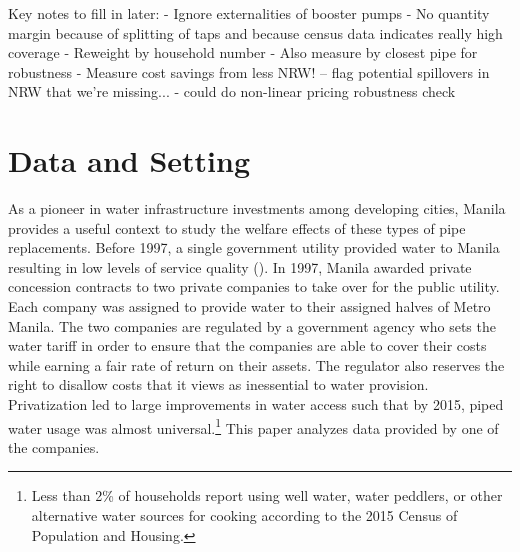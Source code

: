 \documentclass[12pt,table]{article}
\begin{document}
Key notes to fill in later:
- Ignore externalities of booster pumps
- No quantity margin because of splitting of taps and because census data indicates really high coverage
- Reweight by household number
- Also measure by closest pipe for robustness
- Measure cost savings from less NRW! 
	-- flag potential spillovers in NRW that we're missing...
- could do non-linear pricing robustness check







\section{Data and Setting}\label{section:data}

As a pioneer in water infrastructure investments among developing cities, Manila provides a useful context to study the welfare effects of these types of pipe replacements.  Before 1997, a single government utility provided water to Manila resulting in low levels of service quality (\cite{dumol2000manila}).  In 1997, Manila awarded private concession contracts to two private companies to take over for the public utility.  Each company was assigned to provide water to their assigned halves of Metro Manila.  The two companies are regulated by a government agency who sets the water tariff in order to ensure that the companies are able to cover their costs while earning a fair rate of return on their assets.  The regulator also reserves the right to disallow costs that it views as inessential to water provision.  Privatization led to large improvements in water access such that by 2015, piped water usage was almost universal.\footnote{Less than 2\% of households report using well water, water peddlers, or other alternative water sources for cooking according to the 2015 Census of Population and Housing.}  This paper analyzes data provided by one of the companies.  
\end{document}
